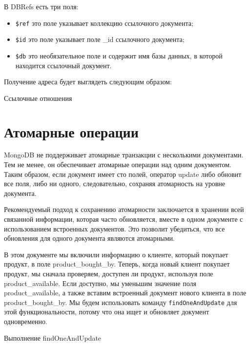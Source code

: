 В DBRefs есть три поля:

\begin{itemize}
	\item \texttt{\$ref} это поле указывает коллекцию ссылочного документа;
	\item \texttt{\$id} это поле указывает поле \_id ссылочного документа;
	\item \texttt{\$db} это необязательное поле и содержит имя базы данных,
		в которой находится ссылочный документ.
\end{itemize}

Получение адреса будет выглядеть следующим образом:

\begin{image}
	\caption{Ссылочные отношения}
	\label{fig:link:relationship}
\end{image}

\section{Атомарные операции}

MongoDB не поддерживает атомарные транзакции с несколькими
документами. Тем не менее, он обеспечивает атомарные операции над одним
документом. Таким образом, если документ имеет сто полей, оператор update
либо обновит все поля, либо ни одного, следовательно, сохраняя атомарность
на уровне документа.\par
Рекомендуемый подход к сохранению атомарности заключается в
хранении всей связанной информации, которая часто обновляется, вместе в
одном документе с использованием встроенных документов. Это позволит
убедиться, что все обновления для одного документа являются атомарными.\par
В этом документе мы включили информацию о клиенте, который
покупает продукт, в поле product\_bought\_by. Теперь, когда новый клиент
покупает продукт, мы сначала проверяем, доступен ли продукт, используя
поле product\_available. Если доступно, мы уменьшим значение поля
product\_available, а также вставим встроенный документ нового клиента в поле
product\_bought\_by. Мы будем использовать команду \texttt{findOneAndUpdate}
для этой функциональности,
потому что она ищет и обновляет документ одновременно.

\begin{image}
	\caption{Выполнение findOneAndUpdate}
	\label{fig:findoneandupdate}
\end{image}

